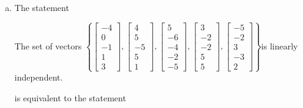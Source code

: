 \begin{exerciseAnswer}
\begin{enumerate}[(a)]
\item The statement 
\begin{center}\begin{minipage}{0.8\textwidth}
 The set of vectors \( \left\{ \left[\begin{array}{c}
-4 \\
0 \\
-1 \\
1 \\
3
\end{array}\right] , \left[\begin{array}{c}
4 \\
5 \\
-5 \\
5 \\
1
\end{array}\right] , \left[\begin{array}{c}
5 \\
-6 \\
-4 \\
-2 \\
-5
\end{array}\right] , \left[\begin{array}{c}
3 \\
-2 \\
-2 \\
5 \\
5
\end{array}\right] , \left[\begin{array}{c}
-5 \\
-2 \\
3 \\
-3 \\
2
\end{array}\right] \right\} \)is linearly independent.
\end{minipage}\end{center}
     is equivalent to the statement 
\begin{center}\begin{minipage}{0.8\textwidth}
 The vector equation \( x_{1} \left[\begin{array}{c}
-4 \\
0 \\
-1 \\
1 \\
3
\end{array}\right] + x_{2} \left[\begin{array}{c}
4 \\
5 \\

\end{array}
\end{minipage}
\end{center}
\end{enumerate}
\end{exerciseAnswer}
